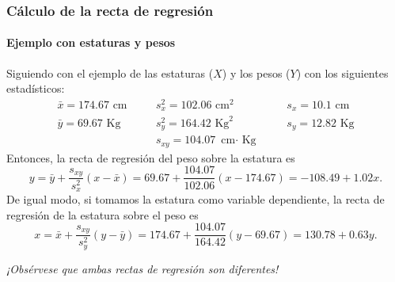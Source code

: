 \begin{frame}
\frametitle{Cálculo de la recta de regresión}
\framesubtitle{Ejemplo con estaturas y pesos}
Siguiendo con el ejemplo de las estaturas ($X$) y los pesos ($Y$) con los siguientes estadísticos:
\[
\begin{array}{lllll}
\bar x = 174.67 \mbox{ cm} & \quad & s^2_x = 102.06 \mbox{ cm}^2 & \quad & s_x = 10.1 \mbox{ cm}\\
\bar y = 69.67 \mbox{ Kg} & & s^2_y = 164.42 \mbox{ Kg}^2 & & s_y = 12.82 \mbox{ Kg}\\
& & s_{xy} = 104.07 \mbox{ cm$\cdot$ Kg} & &
\end{array}
\]
Entonces, la recta de regresión del peso sobre la estatura es
\[
y = \bar y +\frac{s_{xy}}{s_x^2}(x-\bar x) = 69.67+\frac{104.07}{102.06}(x-174.67) = - 108.49+1.02 x .
\]
De igual modo, si tomamos la estatura como variable dependiente, la recta de regresión de la estatura sobre el peso es
\[
x = \bar x +\frac{s_{xy}}{s_y^2}(y-\bar y) = 174.67+\frac{104.07}{164.42}(y-69.67) = 130.78+0.63 y .
\]

\begin{center}
\emph{¡Obsérvese que ambas rectas de regresión son diferentes!}
\end{center}

\end{frame}


